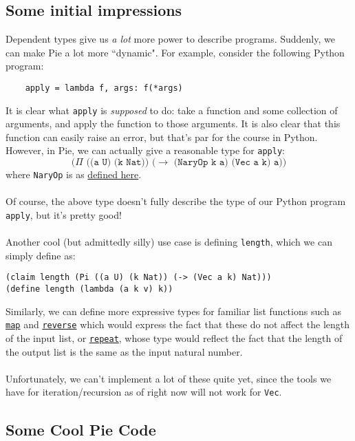 \documentclass{article}
\newcommand{\ttt}[1]{\texttt{#1}}
\begin{document}
\subsection{Some initial impressions}
Dependent types give us \textit{a lot} more power to describe programs. Suddenly, we can make Pie a lot more ``dynamic". For example, consider the following Python program:
\begin{verbatim}
    apply = lambda f, args: f(*args)
\end{verbatim}
It is clear what \ttt{apply} is \textit{supposed} to do: take a function and some collection of arguments, and apply the function to those arguments. It is also clear that this function can easily raise an error, but that's par for the course in Python. However, in Pie, we can actually give a reasonable type for \ttt{apply}: \[
    \ttt{(\(\Pi\) ((a U) (k Nat)) (\(\to\) (NaryOp k a) (Vec a k) a))}
\] where \ttt{NaryOp} is as \hyperref[code:NaryOp]{defined here}. 
\\ \\
Of course, the above type doesn't fully describe the type of our Python program \ttt{apply}, but it's pretty good!
\\ \\
Another cool (but admittedly silly) use case is defining \ttt{length}, which we can simply define as:
\begin{verbatim}
(claim length (Pi ((a U) (k Nat)) (-> (Vec a k) Nat)))
(define length (lambda (a k v) k))
\end{verbatim}
Similarly, we can define more expressive types for familiar list functions such as \hyperref[code:map]{\ttt{map}} and \hyperref[code:reverse]{\ttt{reverse}} which would express the fact that these do not affect the length of the input list, or \hyperref[code:repeat]{\ttt{repeat}}, whose type would reflect the fact that the length of the output list is the same as the input natural number.
\\ \\
Unfortunately, we can't implement a lot of these quite yet, since the tools we have for iteration/recursion as of right now will not work for \ttt{Vec}.
\newpage
\begin{appendix}
\section{Some Cool Pie Code} \label{pie-code-appendix}
\renewcommand{\contentsname}{\normalsize Contents}
\localtableofcontents
\newpage\noindent

\end{appendix}
\end{document}
